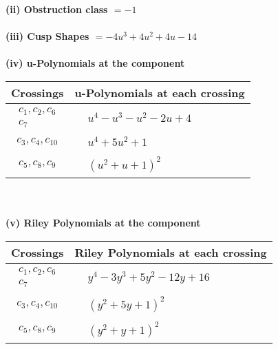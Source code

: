 \documentclass[1p]{elsarticle_modified}
\theoremstyle{definition}
\begin{document}
\flushleft \textbf{(ii) Obstruction class $= -1$}\\~\\
\flushleft \textbf{(iii) Cusp Shapes $= -4 u^3+4 u^2+4 u-14$}\\~\\
\newpage\renewcommand{\arraystretch}{1}
\flushleft \textbf{(iv) u-Polynomials at the component}\newline \\
\begin{tabular}{m{50pt}|m{274pt}}
Crossings & \hspace{64pt}u-Polynomials at each crossing \\
\hline $$\begin{aligned}c_{1},c_{2},c_{6}\\c_{7}\end{aligned}$$&$\begin{aligned}
&u^4- u^3- u^2-2 u+4
\end{aligned}$\\
\hline $$\begin{aligned}c_{3},c_{4},c_{10}\end{aligned}$$&$\begin{aligned}
&u^4+5 u^2+1
\end{aligned}$\\
\hline $$\begin{aligned}c_{5},c_{8},c_{9}\end{aligned}$$&$\begin{aligned}
&(u^2+u+1)^2
\end{aligned}$\\
\hline
\end{tabular}\\~\\
\newpage\renewcommand{\arraystretch}{1}
\flushleft \textbf{(v) Riley Polynomials at the component}\newline \\
\begin{tabular}{m{50pt}|m{274pt}}
Crossings & \hspace{64pt}Riley Polynomials at each crossing \\
\hline $$\begin{aligned}c_{1},c_{2},c_{6}\\c_{7}\end{aligned}$$&$\begin{aligned}
&y^4-3 y^3+5 y^2-12 y+16
\end{aligned}$\\
\hline $$\begin{aligned}c_{3},c_{4},c_{10}\end{aligned}$$&$\begin{aligned}
&(y^2+5 y+1)^2
\end{aligned}$\\
\hline $$\begin{aligned}c_{5},c_{8},c_{9}\end{aligned}$$&$\begin{aligned}
&(y^2+y+1)^2
\end{aligned}$\\
\hline
\end{tabular}\\~\\
\end{document}

